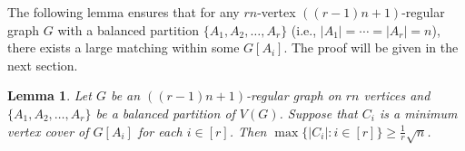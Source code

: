 \documentclass[11pt, a4paper]{article}
\newtheorem{lemma}[theorem]{Lemma}
\theoremstyle{definition}
\newcommand{\<}{\subseteq}
\begin{document}
The following lemma ensures that for any  $rn$-vertex $((r-1)n+1)$-regular graph $G$ with a balanced partition  $\{A_1,A_2,\ldots,A_r\}$ (i.e., $|A_1|=\cdots=|A_r|=n$), there exists a large matching within some $G[A_i]$. The proof will be given in the next section.  %

\begin{lemma}\label{vertex-cover}
Let $G$ be an $((r-1)n+1)$-regular graph on $rn$ vertices and $\{A_1,A_2,\ldots,A_r\}$ be a balanced partition of $V(G)$. Suppose that $C_i$ is a minimum vertex cover of $G[A_i]$ for each $i\in [r]$. Then $\max\{|C_i|:i\in [r]\}\geq \frac{1}{r}\sqrt{n}$.
\end{lemma}
\end{document}
